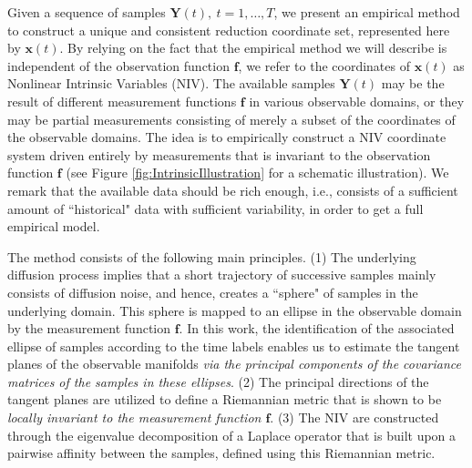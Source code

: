 \documentclass[aip,jcp,preprint]{revtex4-1}
\begin{document}
Given a sequence of samples $\mathbf{Y}(t), \ t=1,\ldots,T$, we present an empirical method to construct a unique and consistent reduction coordinate set, represented here by $\mathbf{x}(t)$.
%
By relying on the fact that the empirical method we will describe is independent of the observation function $\mathbf{f}$,
we refer to the coordinates of $\mathbf{x}(t)$ as Nonlinear Intrinsic Variables (NIV).
%
The available samples $\mathbf{Y}(t)$ may be the result of different measurement functions $\mathbf{f}$ in various observable domains,
or they may be partial measurements consisting of merely a subset of the coordinates of the observable domains.
%
The idea is to empirically construct a NIV coordinate system driven entirely by measurements that is invariant to the observation function $\mathbf{f}$ 
(see Figure \ref{fig:IntrinsicIllustration} for a schematic illustration).
%
We remark that the available data should be rich enough, i.e., consists of a sufficient amount of ``historical" data with sufficient variability, in order to get a full empirical model.

The method consists of the following main principles.
%
(1) The underlying diffusion process implies that a short trajectory of successive samples mainly consists of diffusion noise,
and hence, creates a ``sphere" of samples in the underlying domain.
%
This sphere is mapped to an ellipse in the observable domain by the measurement function $\mathbf{f}$.
%
In this work, the identification of the associated ellipse of samples according to the time labels enables us
to estimate the tangent planes of the observable manifolds {\em via the principal components of the covariance matrices of the samples in these ellipses}.
%
(2) The principal directions of the tangent planes are utilized to define a Riemannian metric that is shown to be {\em locally invariant to the measurement function $\mathbf{f}$}.
%
(3) The NIV are constructed through the eigenvalue decomposition of a Laplace operator that is built upon a pairwise affinity between the samples, defined using this Riemannian metric.
\end{document}

